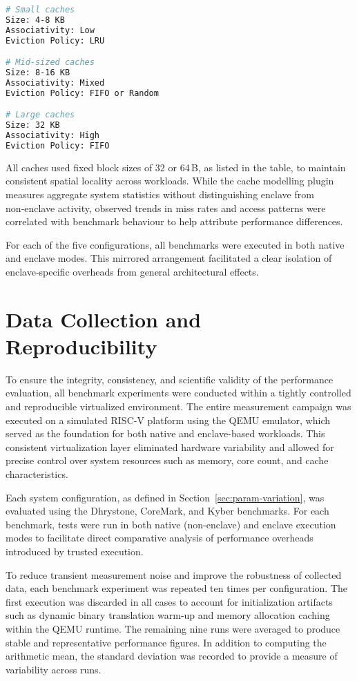 \begin{lstlisting}[language=bash,caption={Cache configuration profiles},label={lst:cache_profiles}]
# Small caches
Size: 4-8 KB
Associativity: Low
Eviction Policy: LRU

# Mid-sized caches
Size: 8-16 KB
Associativity: Mixed
Eviction Policy: FIFO or Random

# Large caches
Size: 32 KB
Associativity: High
Eviction Policy: FIFO
\end{lstlisting}


All caches used fixed block sizes of 32 or 64\,B, as listed in the table, to maintain consistent spatial locality across workloads. While the cache modelling plugin measures aggregate system statistics without distinguishing enclave from non‑enclave activity, observed trends in miss rates and access patterns were correlated with benchmark behaviour to help attribute performance differences.

For each of the five configurations, all benchmarks were executed in both native and enclave modes. This mirrored arrangement facilitated a clear isolation of enclave‑specific overheads from general architectural effects.

\section{Data Collection and Reproducibility}
\label{sec:data-collection}

To ensure the integrity, consistency, and scientific validity of the performance evaluation, all benchmark experiments were conducted within a tightly controlled and reproducible virtualized environment. The entire measurement campaign was executed on a simulated RISC-V platform using the QEMU emulator, which served as the foundation for both native and enclave-based workloads. This consistent virtualization layer eliminated hardware variability and allowed for precise control over system resources such as memory, core count, and cache characteristics.

Each system configuration, as defined in Section~\ref{sec:param-variation}, was evaluated using the Dhrystone, CoreMark, and Kyber benchmarks. For each benchmark, tests were run in both native (non-enclave) and enclave execution modes to facilitate direct comparative analysis of performance overheads introduced by trusted execution.

To reduce transient measurement noise and improve the robustness of collected data, each benchmark experiment was repeated ten times per configuration. The first execution was discarded in all cases to account for initialization artifacts such as dynamic binary translation warm-up and memory allocation caching within the QEMU runtime. The remaining nine runs were averaged to produce stable and representative performance figures. In addition to computing the arithmetic mean, the standard deviation was recorded to provide a measure of variability across runs.

